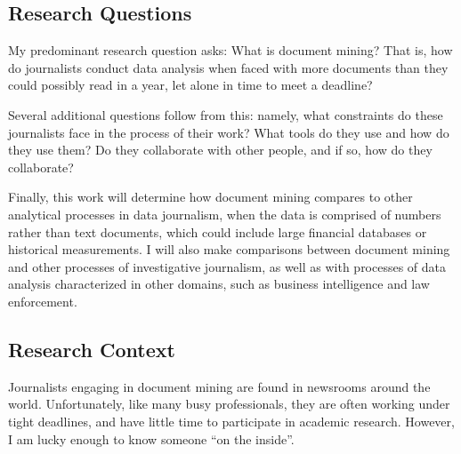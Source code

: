 \subsection{Research Questions}
\label{app:overview:proposal-questions}

My predominant research question asks: What is document mining? 
That is, how do journalists conduct data analysis when faced with more documents than they could possibly read in a year, let alone in time to meet a deadline?

Several additional questions follow from this: namely, what constraints do these journalists face in the process of their work? 
What tools do they use and how do they use them? 
Do they collaborate with other people, and if so, how do they collaborate?

Finally, this work will determine how document mining compares to other analytical processes in data journalism, when the data is comprised of numbers rather than text documents, which could include large financial databases or historical measurements. 
I will also make comparisons between document mining and other processes of investigative journalism, as well as with processes of data analysis characterized in other domains, such as business intelligence and law enforcement.

\subsection{Research Context}
\label{app:overview:proposal-context}

Journalists engaging in document mining are found in newsrooms around the world. 
Unfortunately, like many busy professionals, they are often working under tight deadlines, and have little time to participate in academic research. 
However, I am lucky enough to know someone ``on the inside''.

